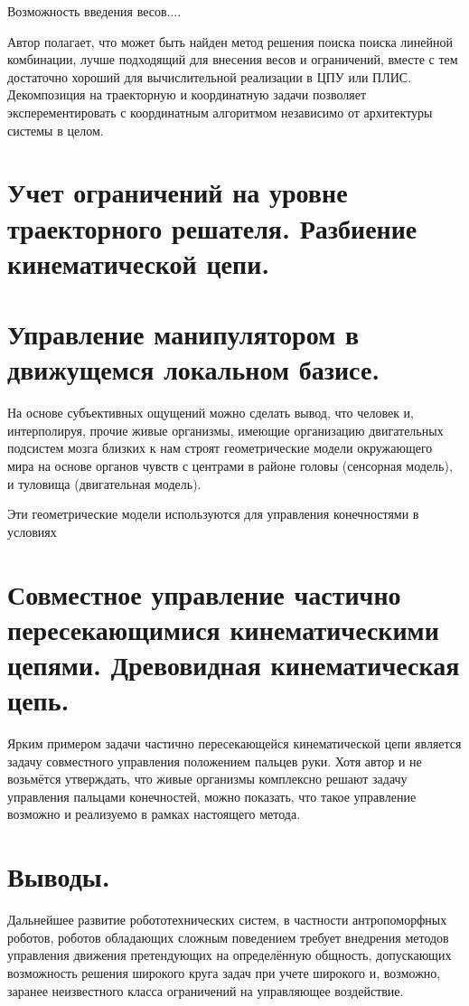 \documentclass[12pt,a4paper,titlepage]{article}
\begin{document}
Возможность введения весов....

Автор полагает, что может быть найден метод решения поиска поиска линейной комбинации, лучше подходящий для внесения весов и ограничений, вместе с тем достаточно хороший для вычислительной реализации в ЦПУ или ПЛИС. Декомпозиция на траекторную и координатную задачи позволяет эксперементировать с координатным алгоритмом независимо от архитектуры системы в целом.

\newpage
\section{Учет ограничений на уровне траекторного решателя. Разбиение кинематической цепи.}

\newpage
\section{Управление манипулятором в движущемся локальном базисе.}
На основе субъективных ощущений можно сделать вывод, что человек и, интерполируя, прочие живые организмы, имеющие организацию двигательных подсистем мозга близких к нам строят геометрические модели окружающего мира на основе органов чувств с центрами в районе головы (сенсорная модель), и туловища (двигательная модель).

Эти геометрические модели используются для управления конечностями в условиях

\newpage 
\section{Совместное управление частично пересекающимися кинематическими цепями. Древовидная кинематическая цепь.}

Ярким примером задачи частично пересекающейся кинематической цепи является задачу совместного управления положением пальцев руки. Хотя автор и не возьмётся утверждать, что живые организмы комплексно решают задачу управления пальцами конечностей, можно показать, что такое управление возможно и реализуемо в рамках настоящего метода.

\newpage
\section{Выводы.}
Дальнейшее развитие робототехнических систем, в частности антропоморфных роботов, роботов обладающих сложным поведением требует внедрения методов управления движения претендующих на определённую общность, допускающих возможность решения широкого круга задач при учете широкого и, возможно, заранее неизвестного класса ограничений на управляющее воздействие.
\end{document}
